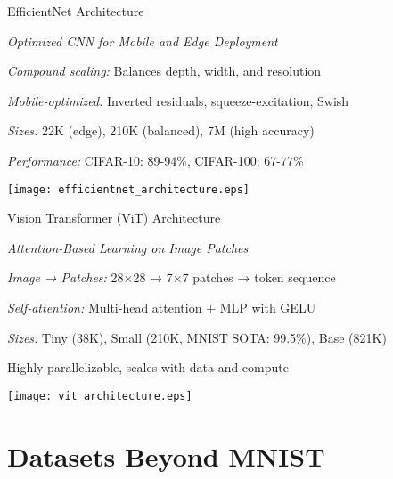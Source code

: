 \begin{slide}[\slideopts,toc={EfficientNet}]{EfficientNet Architecture}
  
  \emph{Optimized CNN for Mobile and Edge Deployment}
  
  \begin{itemize}
    \mpitem \emph{Compound scaling:} Balances depth, width, and resolution
    
    \mpitem \emph{Mobile-optimized:} Inverted residuals, squeeze-excitation, Swish
    
    \mpitem \emph{Sizes:} 22K (edge), 210K (balanced), 7M (high accuracy)
    
    \mpitem \emph{Performance:} CIFAR-10: 89-94\%, CIFAR-100: 67-77\%
  \end{itemize}
  
  \vspace{0.5em}
  \centerline{\texttt{[image: efficientnet\_architecture.eps]}}
\end{slide}

\begin{slide}[\slideopts,toc={ViT}]{Vision Transformer (ViT) Architecture}
  
  \emph{Attention-Based Learning on Image Patches}
  
  \begin{itemize}
    \mpitem \emph{Image → Patches:} 28×28 → 7×7 patches → token sequence
    
    \mpitem \emph{Self-attention:} Multi-head attention + MLP with GELU
    
    \mpitem \emph{Sizes:} Tiny (38K), Small (210K, MNIST SOTA: 99.5\%), Base (821K)
    
    \mpitem Highly parallelizable, scales with data and compute
  \end{itemize}
  
  \vspace{0.5em}
  \centerline{\texttt{[image: vit\_architecture.eps]}}
\end{slide}

\section[toc={New Dataset Formats}]{Datasets Beyond MNIST}

